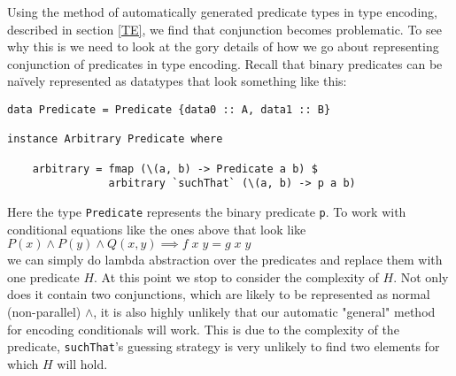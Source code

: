 Using the method of automatically generated predicate types in type encoding, described in section
\ref{TE}, we find that conjunction becomes problematic. To see why this is we need to look at the
gory details of how we go about representing conjunction of predicates in type encoding. Recall that
binary predicates can be naïvely represented as datatypes that look something like this:
\begin{verbatim}data Predicate = Predicate {data0 :: A, data1 :: B}

instance Arbitrary Predicate where
    
    arbitrary = fmap (\(a, b) -> Predicate a b) $
                arbitrary `suchThat` (\(a, b) -> p a b)

\end{verbatim}
Here the type \texttt{Predicate} represents the binary predicate \texttt{p}.
To work with conditional equations like the ones above that look like
\\$P(x) \wedge P(y) \wedge Q(x, y)\implies f\;x\;y=g\;x\;y$\\
we can simply do lambda abstraction over the predicates and replace them with
one predicate $H$. At this point we stop to consider the complexity of $H$. Not only
does it contain two conjunctions, which are likely to be represented as normal (non-parallel) $\wedge$,
it is also highly unlikely that our automatic "general" method for encoding conditionals
will work. This is due to the complexity of the predicate, \texttt{suchThat}'s guessing strategy
is very unlikely to find two elements for which $H$ will hold.

